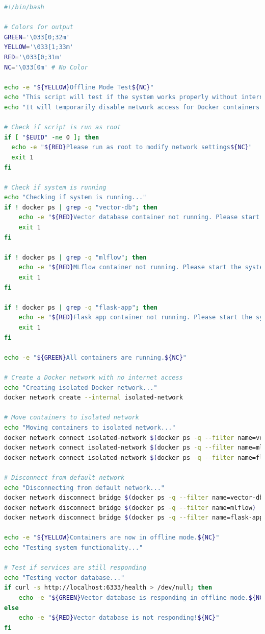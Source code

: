 \documentclass[
  screen,review,acmlarge]{acmart}
\begin{document}
\begin{lstlisting}[language=bash]
#!/bin/bash

# Colors for output
GREEN='\033[0;32m'
YELLOW='\033[1;33m'
RED='\033[0;31m'
NC='\033[0m' # No Color

echo -e "${YELLOW}Offline Mode Test${NC}"
echo "This script will test if the system works properly without internet connectivity."
echo "It will temporarily disable network access for Docker containers."

# Check if script is run as root
if [ "$EUID" -ne 0 ]; then
  echo -e "${RED}Please run as root to modify network settings${NC}"
  exit 1
fi

# Check if system is running
echo "Checking if system is running..."
if ! docker ps | grep -q "vector-db"; then
    echo -e "${RED}Vector database container not running. Please start the system first.${NC}"
    exit 1
fi

if ! docker ps | grep -q "mlflow"; then
    echo -e "${RED}MLflow container not running. Please start the system first.${NC}"
    exit 1
fi

if ! docker ps | grep -q "flask-app"; then
    echo -e "${RED}Flask app container not running. Please start the system first.${NC}"
    exit 1
fi

echo -e "${GREEN}All containers are running.${NC}"

# Create a Docker network with no internet access
echo "Creating isolated Docker network..."
docker network create --internal isolated-network

# Move containers to isolated network
echo "Moving containers to isolated network..."
docker network connect isolated-network $(docker ps -q --filter name=vector-db)
docker network connect isolated-network $(docker ps -q --filter name=mlflow)
docker network connect isolated-network $(docker ps -q --filter name=flask-app)

# Disconnect from default network
echo "Disconnecting from default network..."
docker network disconnect bridge $(docker ps -q --filter name=vector-db)
docker network disconnect bridge $(docker ps -q --filter name=mlflow)
docker network disconnect bridge $(docker ps -q --filter name=flask-app)

echo -e "${YELLOW}Containers are now in offline mode.${NC}"
echo "Testing system functionality..."

# Test if services are still responding
echo "Testing vector database..."
if curl -s http://localhost:6333/health > /dev/null; then
    echo -e "${GREEN}Vector database is responding in offline mode.${NC}"
else
    echo -e "${RED}Vector database is not responding!${NC}"
fi


\end{lstlisting}
\end{document}
